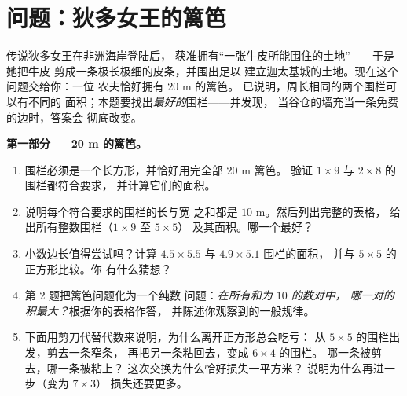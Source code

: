 \section{问题：狄多女王的篱笆}

\begin{problem}
\label{pb:g6:measure:1}
传说狄多女王在非洲海岸登陆后，
获准拥有“一张牛皮所能围住的土地”——于是她把牛皮
剪成一条极长极细的皮条，并围出足以
建立迦太基城的土地。现在这个问题交给你：一位
农夫恰好拥有 $20$ m 的篱笆。
已说明，周长相同的两个围栏可以有不同的
面积；本题要找出\emph{最好的}围栏——并发现，
当谷仓的墙充当一条免费的边时，答案会
彻底改变。

\medskip
\noindent\textbf{第一部分 --- 20 m 的篱笆。}
\begin{enumerate}
  \item 围栏必须是一个长方形，并恰好用完全部 $20$ m 篱笆。
        验证 $1 \times 9$ 与 $2 \times 8$ 的围栏都符合要求，
        并计算它们的面积。
  \item 说明每个符合要求的围栏的长与宽
        之和都是 $10$ m。然后列出完整的表格，
        给出所有整数围栏（$1 \times 9$ 至 $5 \times 5$）
        及其面积。哪一个最好？
  \item 小数边长值得尝试吗？计算
        $4.5 \times 5.5$ 与 $4.9 \times 5.1$ 围栏的面积，
        并与 $5 \times 5$ 的正方形比较。你
        有什么猜想？
  \item 第 2 题把篱笆问题化为一个纯数
        问题：\emph{在所有和为 $10$ 的数对中，
        哪一对的积最大？}根据你的表格作答，
        并陈述你观察到的一般规律。
  \item 下面用剪刀代替代数来说明，为什么离开正方形总会吃亏：
        从 $5 \times 5$ 的围栏出发，剪去一条窄条，
        再把另一条粘回去，变成 $6 \times 4$ 的围栏。
        哪一条被剪去，哪一条被粘上？
        这次交换为什么恰好损失一平方米？
        说明为什么再进一步（变为 $7 \times 3$）
        损失还要更多。
\end{enumerate}


\end{problem}
